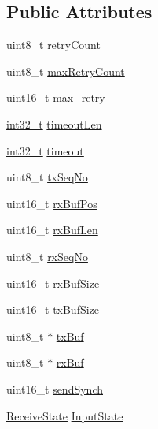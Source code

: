 \subsection*{Public Attributes}
\begin{DoxyCompactItemize}
\item 
uint8\-\_\-t \hyperlink{group___uploader_gaa59e48abe3c6ec88333502c7abd9c309}{retry\-Count}
\item 
uint8\-\_\-t \hyperlink{group___uploader_ga39fea4d573ab6d52b3b2df145d6d3f7a}{max\-Retry\-Count}
\item 
uint16\-\_\-t \hyperlink{group___uploader_ga6a20c78337e965260038e132527ba852}{max\-\_\-retry}
\item 
\hyperlink{glext_8h_a37994e3b11c72957c6f454c6ec96d43d}{int32\-\_\-t} \hyperlink{group___uploader_gacad18aa8d7e13c6500409da966437d3d}{timeout\-Len}
\item 
\hyperlink{glext_8h_a37994e3b11c72957c6f454c6ec96d43d}{int32\-\_\-t} \hyperlink{classport_a55fd4c8b1b478fc50dca845e3f5dd06c}{timeout}
\item 
uint8\-\_\-t \hyperlink{group___uploader_ga9add555476b07ac554ed3371358848bb}{tx\-Seq\-No}
\item 
uint16\-\_\-t \hyperlink{group___uploader_ga75073512a14d809c8ed03df447815d09}{rx\-Buf\-Pos}
\item 
uint16\-\_\-t \hyperlink{group___uploader_ga1de477395cd5f7c06623860c2d8017e4}{rx\-Buf\-Len}
\item 
uint8\-\_\-t \hyperlink{group___uploader_ga82ee05e7b1de6f1b55b375364ce5bc83}{rx\-Seq\-No}
\item 
uint16\-\_\-t \hyperlink{group___uploader_ga640561a803c92539943ec445afba5e72}{rx\-Buf\-Size}
\item 
uint16\-\_\-t \hyperlink{group___uploader_ga108da44374d16b8153824a65fec5a7ae}{tx\-Buf\-Size}
\item 
uint8\-\_\-t $\ast$ \hyperlink{group___uploader_gae89971c9e5c4436adb8255a2a086577d}{tx\-Buf}
\item 
uint8\-\_\-t $\ast$ \hyperlink{group___uploader_gada605b2b244d99c3f2e7d9a77554d960}{rx\-Buf}
\item 
uint16\-\_\-t \hyperlink{group___uploader_gafc6af17b7bd943cd40a0223eed26a0c3}{send\-Synch}
\item 
\hyperlink{experimental_2_u_s_b___u_p_l_o_a_d___t_o_o_l_2_s_s_p_2common_8h_ab10fc109fdda19fca8e7faf999d5a342}{Receive\-State} \hyperlink{group___uploader_ga4e66fb46404301e2985093c34ae57379}{Input\-State}
\item 

\end{DoxyCompactItemize}
